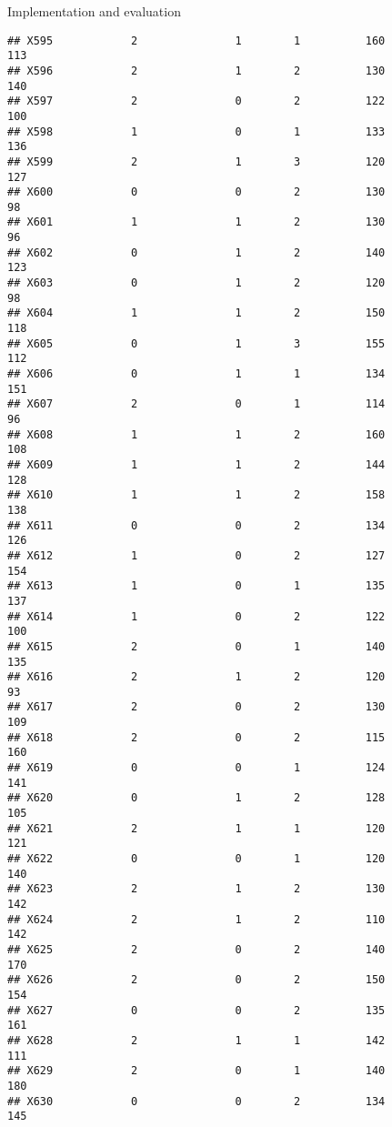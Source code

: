 \documentclass[
  ignorenonframetext,
]{beamer}
\begin{document}
\begin{frame}[fragile]{Implementation and evaluation}
\begin{verbatim}
## X595            2               1        1          160            113
## X596            2               1        2          130            140
## X597            2               0        2          122            100
## X598            1               0        1          133            136
## X599            2               1        3          120            127
## X600            0               0        2          130             98
## X601            1               1        2          130             96
## X602            0               1        2          140            123
## X603            0               1        2          120             98
## X604            1               1        2          150            118
## X605            0               1        3          155            112
## X606            0               1        1          134            151
## X607            2               0        1          114             96
## X608            1               1        2          160            108
## X609            1               1        2          144            128
## X610            1               1        2          158            138
## X611            0               0        2          134            126
## X612            1               0        2          127            154
## X613            1               0        1          135            137
## X614            1               0        2          122            100
## X615            2               0        1          140            135
## X616            2               1        2          120             93
## X617            2               0        2          130            109
## X618            2               0        2          115            160
## X619            0               0        1          124            141
## X620            0               1        2          128            105
## X621            2               1        1          120            121
## X622            0               0        1          120            140
## X623            2               1        2          130            142
## X624            2               1        2          110            142
## X625            2               0        2          140            170
## X626            2               0        2          150            154
## X627            0               0        2          135            161
## X628            2               1        1          142            111
## X629            2               0        1          140            180
## X630            0               0        2          134            145

\end{verbatim}
\end{frame}
\end{document}
